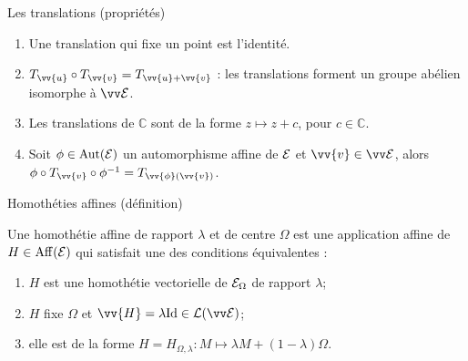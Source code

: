 \documentclass{m53beamer}
\begin{document}
  \begin{frame}{Les translations (propriétés)}
    \begin{enumerate}[<+(1)->]
      \item Une translation qui fixe un point est l'identité.
      \item $T_{\vv{u}}\circ T_{\vv{v}} = T_{\vv{u}+\vv{v}}$ : les translations forment un groupe abélien isomorphe à $\ev{E}$.
      \item Les translations de $\mathbb{C}$ sont de la forme $z \mapsto z+c$, pour $c \in \mathbb{C}$.
      \item Soit $\phi \in \operatorname{Aut}(\mathcal{E})$ un automorphisme affine de $\mathcal{E}$ et $\vv{v} \in \ev{E}$, alors $\phi\circ T_{\vv{v}}\circ\phi^{-1}=T_{\vv{\phi}(\vv{v})}$.
    \end{enumerate}
  \end{frame}
  \begin{frame}{Homothéties affines (définition)}
    \begin{defprop}
      Une \alert{homothétie affine de rapport $\lambda$ et de centre $\Omega$} est une application affine de $H \in\operatorname{Aff}(\mathcal{E})$ qui satisfait une des conditions équivalentes :
      \begin{enumerate}[<+(1)->]
        \item $H$ est une homothétie vectorielle de $\mathcal{E}_{\Omega}$ de rapport $\lambda$;
        \item $H$ fixe $\Omega$ et $\vv{H}=\lambda\id \in \lin(\ev{E})$;
        \item elle est de la forme $H=H_{\Omega,\lambda}:M \mapsto \lambda M + (1- \lambda)\Omega$.
      \end{enumerate}
    \end{defprop}
  \end{frame}
\end{document}
